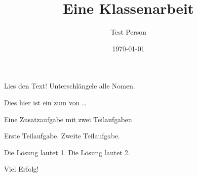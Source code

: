 \documentclass[a4paper]{scrartcl}
\author{Test Person}
\date{\today}
\title{Eine Klassenarbeit}
\begin{document}
\begin{aufgabe}[points={2},bonus-points={3}]
    \blindtext
    \begin{teilaufgaben}
        \teilaufgabe Lies den Text!
        \teilaufgabe Unterschlängele alle Nomen.
    \end{teilaufgaben}
    \begin{loesung}
        Dies hier ist ein  zum  von \dots
    \end{loesung}
\end{aufgabe}

\begin{aufgabe*}
    Eine Zusatzaufgabe mit zwei Teilaufgaben
    \begin{teilaufgaben}
        \teilaufgabe Erste Teilaufgabe.
        \teilaufgabe Zweite Teilaufgabe.
    \end{teilaufgaben}
    \begin{loesung*}
        \begin{teilaufgaben}
            \teilaufgabe Die Lösung lautet 1.
            \teilaufgabe Die Lösung lautet 2.
        \end{teilaufgaben}
    \end{loesung*}
\end{aufgabe*}

\vspace{1cm}
{\Huge Viel Erfolg!}
\end{document}
